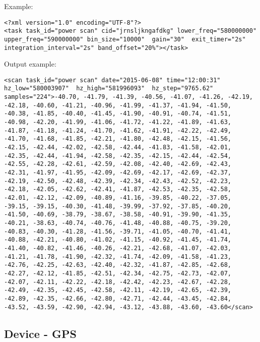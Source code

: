 Example:

\lstset{language=XML}
\begin{lstlisting}
<?xml version="1.0" encoding="UTF-8"?>
<task task_id="power scan" cid="jrnsljkngafdkg" lower_freq="580000000" upper_freq="590000000" bin_size="10000"  gain="30"  exit_timer="2s" integration_interval="2s" band_offset="20%"></task>
\end{lstlisting}

Output example:
\begin{lstlisting}
<scan task_id="power scan" date="2015-06-08" time="12:00:31" hz_low="580003907"  hz_high="581996093"  hz_step="9765.62" samples="224">-40.70, -41.79, -41.39, -40.56, -41.07, -41.26, -42.19, -42.18, -40.60, -41.21, -40.96, -41.99, -41.37, -41.94, -41.50, -40.38, -41.85, -40.40, -41.45, -41.90, -40.91, -40.74, -41.51, -40.98, -42.20, -41.99, -41.06, -41.72, -41.22, -41.89, -41.63, -41.87, -41.18, -41.24, -41.70, -41.62, -41.91, -42.22, -42.49, -41.70, -41.68, -41.85, -42.21, -41.80, -42.48, -42.15, -41.56, -42.15, -42.44, -42.02, -42.58, -42.44, -41.83, -41.58, -42.01, -42.35, -42.44, -41.94, -42.58, -42.35, -42.15, -42.44, -42.54, -42.55, -42.28, -42.61, -42.59, -42.08, -42.40, -42.69, -42.43, -42.31, -41.97, -41.95, -42.09, -42.69, -42.17, -42.69, -42.37, -42.19, -42.50, -42.48, -42.39, -42.34, -42.43, -42.52, -42.23, -42.18, -42.05, -42.62, -42.41, -41.87, -42.53, -42.35, -42.58, -42.01, -42.12, -42.09, -40.89, -41.16, -39.85, -40.22, -37.05, -39.15, -39.15, -40.30, -41.48, -39.99, -37.92, -37.85, -40.20, -41.50, -40.69, -38.79, -38.67, -38.58, -40.91, -39.90, -41.35, -40.21, -38.63, -40.74, -40.76, -41.48, -40.88, -40.75, -39.20, -40.83, -40.30, -41.28, -41.56, -39.71, -41.05, -40.70, -41.41, -40.88, -42.21, -40.80, -41.02, -41.15, -40.92, -41.45, -41.74, -41.40, -40.82, -41.46, -40.26, -42.21, -42.68, -41.07, -42.03, -41.21, -41.78, -41.90, -42.32, -41.74, -42.09, -41.58, -41.23, -42.76, -42.25, -42.63, -42.40, -42.32, -41.87, -42.85, -42.68, -42.27, -42.12, -41.85, -42.51, -42.34, -42.75, -42.73, -42.07, -42.07, -42.11, -42.22, -42.18, -42.42, -42.23, -42.67, -42.28, -42.49, -42.35, -42.45, -42.58, -42.11, -42.19, -42.65, -42.39, -42.89, -42.35, -42.66, -42.80, -42.71, -42.44, -43.45, -42.84, -43.52, -43.59, -42.90, -42.94, -43.12, -43.88, -43.60, -43.60</scan>
\end{lstlisting}

\subsection{Device - GPS}
